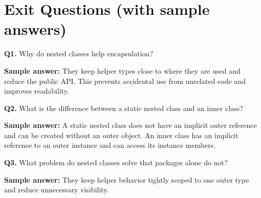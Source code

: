 \documentclass[11pt]{article}
\begin{document}
\section{Exit Questions (with sample answers)}
\textbf{Q1.} Why do nested classes help encapsulation?\par
\textbf{Sample answer:} They keep helper types close to where they are used and reduce the public API. This prevents accidental use from unrelated code and improves readability.

\vspace{0.6em}
\textbf{Q2.} What is the difference between a static nested class and an inner class?\par
\textbf{Sample answer:} A static nested class does not have an implicit outer reference and can be created without an outer object. An inner class has an implicit reference to an outer instance and can access its instance members.

\vspace{0.6em}
\textbf{Q3.} What problem do nested classes solve that packages alone do not?\par
\textbf{Sample answer:} They keep helper behavior tightly scoped to one outer type and reduce unnecessary visibility.
\end{document}
